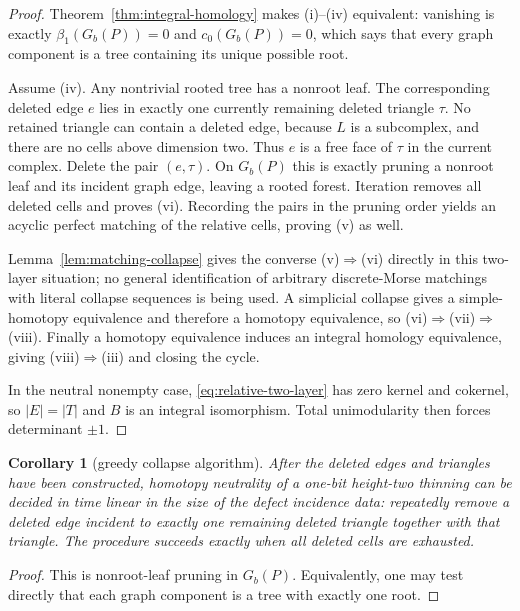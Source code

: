 \documentclass[11pt]{article}
\newtheorem{corollary}[theorem]{Corollary}
\theoremstyle{definition}
\theoremstyle{remark}
\begin{document}
\begin{proof}
Theorem~\ref{thm:integral-homology} makes (i)--(iv) equivalent: vanishing is exactly
$\beta_1(G_b(P))=0$ and $c_0(G_b(P))=0$, which says that every graph component is a
tree containing its unique possible root.

Assume (iv).  Any nontrivial rooted tree has a nonroot leaf.  The corresponding
deleted edge $e$ lies in exactly one currently remaining deleted triangle $\tau$.
No retained triangle can contain a deleted edge, because $L$ is a subcomplex, and
there are no cells above dimension two.  Thus $e$ is a free face of $\tau$ in the
current complex.  Delete the pair $(e,\tau)$.  On $G_b(P)$ this is exactly pruning a
nonroot leaf and its incident graph edge, leaving a rooted forest.  Iteration removes
all deleted cells and proves (vi).  Recording the pairs in the pruning order yields an
acyclic perfect matching of the relative cells, proving (v) as well.

Lemma~\ref{lem:matching-collapse} gives the converse (v)$\Rightarrow$(vi) directly in
this two-layer situation; no general identification of arbitrary discrete-Morse
matchings with literal collapse sequences is being used.  A simplicial collapse gives
a simple-homotopy equivalence and
therefore a homotopy equivalence, so (vi)$\Rightarrow$(vii)$\Rightarrow$(viii).
Finally a homotopy equivalence induces an integral homology equivalence, giving
(viii)$\Rightarrow$(iii) and closing the cycle.

In the neutral nonempty case, \eqref{eq:relative-two-layer} has zero kernel and
cokernel, so $|E|=|T|$ and $B$ is an integral isomorphism.  Total unimodularity then
forces determinant $\pm1$.
\end{proof}

\begin{corollary}[greedy collapse algorithm]\label{cor:greedy}
After the deleted edges and triangles have been constructed, homotopy neutrality of a
one-bit height-two thinning can be decided in time linear in the size of the defect
incidence data: repeatedly remove a deleted edge incident to exactly one remaining
deleted triangle together with that triangle.  The procedure succeeds exactly when
all deleted cells are exhausted.
\end{corollary}

\begin{proof}
This is nonroot-leaf pruning in $G_b(P)$.  Equivalently, one may test directly that
each graph component is a tree with exactly one root.
\end{proof}
\end{document}
